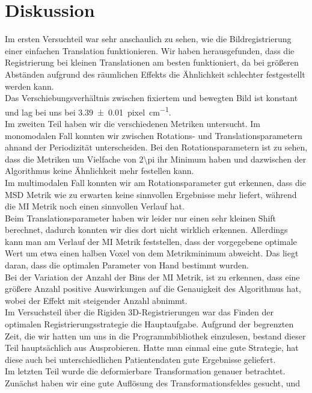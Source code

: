 \section{Diskussion}
Im ersten Versuchteil war sehr anschaulich zu sehen, wie die Bildregistrierung
einer einfachen Translation funktionieren. Wir haben herausgefunden, dass die
Registrierung bei kleinen Translationen am besten funktioniert, da bei größeren
Abständen aufgrund des räumlichen Effekts die Ähnlichkeit schlechter
festgestellt werden kann.\\
Das Verschiebungsverhältnis zwischen fixiertem und bewegten Bild ist konstant
und lag bei uns bei \SI{3.39(1)}{pixel\per\centi\meter}.\\
Im zweiten Teil haben wir die verschiedenen Metriken untersucht. Im monomodalen
Fall konnten wir zwischen Rotations- und Translationsparametern ahnand der
Periodizität unterscheiden. Bei den Rotationsparametern ist zu sehen, dass die
Metriken um Vielfache von \num{2\pi} ihr Minimum haben und dazwischen der
Algorithmus keine Ähnlichkeit mehr festellen kann.\\
Im multimodalen Fall konnten wir am Rotationsparameter gut erkennen, dass die
MSD Metrik wie zu erwarten keine sinnvollen Ergebnisse mehr liefert, während die
MI Metrik noch einen sinnvollen Verlauf hat.\\
Beim Translationsparameter haben wir leider nur einen sehr kleinen Shift
berechnet, dadurch konnten wir dies dort nicht wirklich erkennen. Allerdings
kann man am Verlauf der MI Metrik feststellen, dass der vorgegebene optimale
Wert um etwa einen halben Voxel von dem Metrikminimum abweicht. Das liegt daran,
dass die optimalen Parameter von Hand bestimmt wurden.\\
Bei der Variation der Anzahl der Bins der MI Metrik, ist zu erkennen, dass eine
größere Anzahl positive Auswirkungen auf die Genauigkeit des Algorithmus hat,
wobei der Effekt mit steigender Anzahl abnimmt.\\
Im Versuchsteil über die Rigiden 3D-Registrierungen war das Finden der
optimalen Registrierungsstrategie die Hauptaufgabe. Aufgrund der begrenzten
Zeit, die wir hatten um uns in die Programmbibliothek einzulesen, bestand
dieser Teil hauptsächlich aus Ausprobieren. Hatte man einmal eine gute
Strategie, hat diese auch bei unterschiedlichen Patientendaten gute Ergebnisse
geliefert.\\
Im letzten Teil wurde die deformierbare Transformation genauer betrachtet.
Zunächst haben wir eine gute Auflösung des Transformationsfeldes gesucht, und
